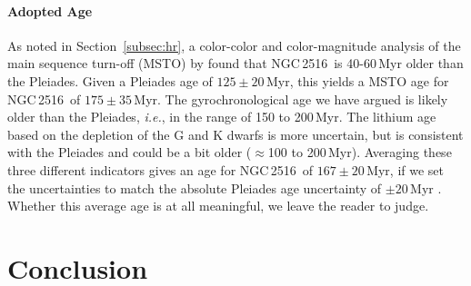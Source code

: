 \documentclass[12pt,twocolumn,tighten]{aastex63}
\newcommand{\cn}{NGC\,2516} %
\begin{document}
\paragraph{Adopted Age}
As noted in Section~\ref{subsec:hr}, a color-color and color-magnitude analysis of the
main sequence turn-off (MSTO) by \citet{cummings_2018} found that \cn\
is 40-60\,Myr older than the Pleiades.  Given a Pleiades age of
$125\pm20$\,Myr, this yields a MSTO age for \cn\ of $175\pm35$\,Myr.
The gyrochronological age we have argued is likely older than the
Pleiades, {\it i.e.}, in the range of 150 to 200\,Myr.  The lithium
age based on the depletion of the G and K dwarfs is more uncertain,
but is consistent with the Pleiades and could be a bit older
($\approx$100 to 200\,Myr).  Averaging these three different
indicators gives an age for \cn\ of $167\pm20$\,Myr, if we set the
uncertainties to match the absolute Pleiades age uncertainty of $\pm
20\,$Myr \citep{soderblom_ages_2014}.  Whether this average age is at
all meaningful, we leave the reader to judge.



\section{Conclusion}
\label{sec:conclusion}
\end{document}
